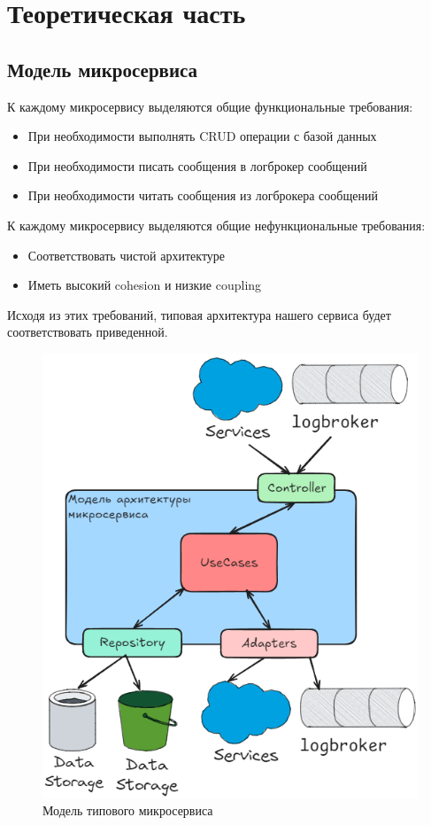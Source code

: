  \chapter{Теоретическая часть}

\section{Модель микросервиса}

К каждому микросервису выделяются общие функциональные требования:
\begin{itemize}
  \item При необходимости выполнять CRUD операции с базой данных
  \item При необходимости писать сообщения в логброкер сообщений
  \item При необходимости читать сообщения из логброкера сообщений
\end{itemize}

К каждому микросервису выделяются общие нефункциональные требования:
\begin{itemize}
  \item Соответствовать чистой архитектуре
  \item Иметь высокий cohesion и низкие coupling
\end{itemize}


Исходя из этих требований, типовая архитектура нашего сервиса будет соответствовать приведенной.

\begin{figure}[H]%
	\begin{center}
		\includegraphics[width=.6\columnwidth]{./img/tipovoy_micric.png}%
	\end{center}
	\caption{Модель типового микросервиса}%
	\label{pic:tipovoy_micric}%
\end{figure}

